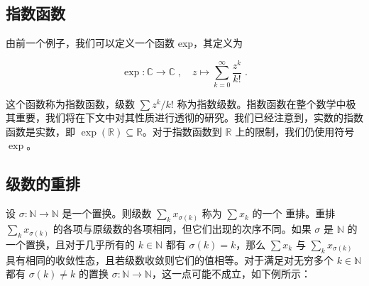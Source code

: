 \subsection*{指数函数}

由前一个例子，我们可以定义一个函数 exp，其定义为

\[
\exp:\mathbb{C}\to\mathbb{C}\;,\quad z\mapsto\sum_{k=0}^{\infty}\frac{z^{k}}{k!}\;.
\]

这个函数称为指数函数，级数 $ \sum z^k / k! $ 称为指数级数。指数函数在整个数学中极其重要，我们将在下文中对其性质进行透彻的研究。我们已经注意到，实数的指数函数是实数，即 $ \exp(\mathbb{R}) \subseteq \mathbb{R} $。对于指数函数到 $ \mathbb{R} $ 上的限制，我们仍使用符号 $ \exp $。

\subsection*{级数的重排}

设 $\sigma: \mathbb{N} \to \mathbb{N}$ 是一个置换。则级数 $\sum_k x_{\sigma(k)}$ 称为 $\sum x_k$ 的一个 $\text{重排}$。重排 $\sum_k x_{\sigma(k)}$ 的各项与原级数的各项相同，但它们出现的次序不同。如果 $\sigma$ 是 $\mathbb{N}$ 的一个置换，且对于几乎所有的 $k \in \mathbb{N}$ 都有 $\sigma(k) = k$，那么 $\sum x_k$ 与 $\sum_k x_{\sigma(k)}$ 具有相同的收敛性态，且若级数收敛则它们的值相等。对于满足对无穷多个 $k \in \mathbb{N}$ 都有 $\sigma(k) \neq k$ 的置换 $\sigma: \mathbb{N} \to \mathbb{N}$，这一点可能不成立，如下例所示：

